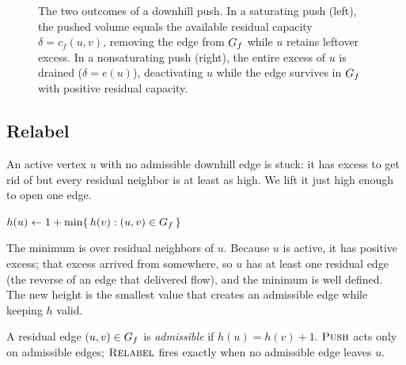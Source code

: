 \begin{figure}[H]
\caption{The two outcomes of a downhill push. In a saturating push (left), the pushed volume equals the available residual capacity $\delta=c_f(u,v)$, removing the edge from $G_f$ while $u$ retains leftover excess. In a nonsaturating push (right), the entire excess of $u$ is drained ($\delta=e(u)$), deactivating $u$ while the edge survives in $G_f$ with positive residual capacity.}
\label{ch13:fig-push-types}
\end{figure}

\subsection*{Relabel}

An active vertex $u$ with no admissible downhill edge is stuck: it has excess to get rid of but every residual neighbor is at least as high. We lift it just high enough to open one edge.

\begin{algorithm}[H]
\caption{$\textsc{Relabel}(u)$ -- applies when $e(u)>0$ and $h(u)\le h(v)$ for all $(u,v)\in\Gph_f$}
\label{ch13:alg-relabel}
\DontPrintSemicolon
$h(u) \gets 1 + \min\{\, h(v) : (u,v)\in G_f \,\}$\;
\end{algorithm}

The minimum is over residual neighbors of $u$. Because $u$ is active, it has positive excess; that excess arrived from somewhere, so $u$ has at least one residual edge (the reverse of an edge that delivered flow), and the minimum is well defined. The new height is the smallest value that creates an admissible edge while keeping $h$ valid.

\begin{definition}
\label{ch13:def-admissible}
A residual edge $(u,v)\in\Gph_f$ is \emph{admissible} if $h(u)=h(v)+1$. $\textsc{Push}$ acts only on admissible edges; $\textsc{Relabel}$ fires exactly when no admissible edge leaves $u$.
\end{definition}

